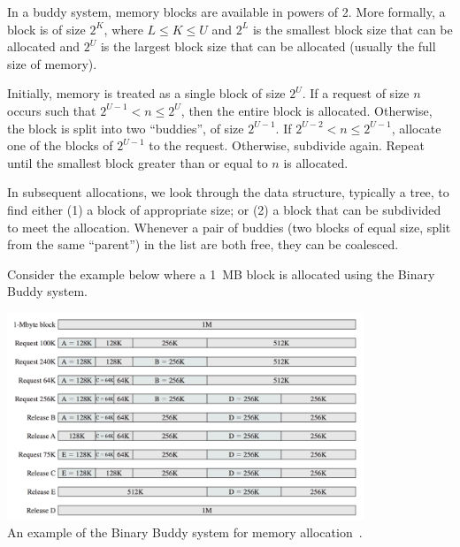 In a buddy system, memory blocks are available in powers of 2. More formally, a block is of size $2^{K}$, where $L \leq K \leq U$ and $2^{L}$ is the smallest block size that can be allocated and $2^{U}$ is the largest block size that can be allocated (usually the full size of memory). 

Initially, memory is treated as a single block of size $2^{U}$. If a request of size $n$ occurs such that $2^{U-1} < n \leq 2^{U}$, then the entire block is allocated. Otherwise, the block is split into two ``buddies'', of size $2^{U-1}$. If $2^{U-2} < n \leq 2^{U-1}$, allocate one of the blocks of $2^{U-1}$ to the request. Otherwise, subdivide again. Repeat until the smallest block greater than or equal to $n$ is allocated. 

In subsequent allocations, we look through the data structure, typically a tree, to find either (1) a block of appropriate size; or (2) a block that can be subdivided to meet the allocation. Whenever a pair of buddies (two blocks of equal size, split from the same ``parent'') in the list are both free, they can be coalesced.

Consider the example below where a 1~MB block is allocated using the Binary Buddy system.

\begin{center}
\includegraphics[width=0.80\textwidth]{images/binary-buddy.png}\\
An example of the Binary Buddy system for memory allocation~\cite{osi}.
\end{center}




